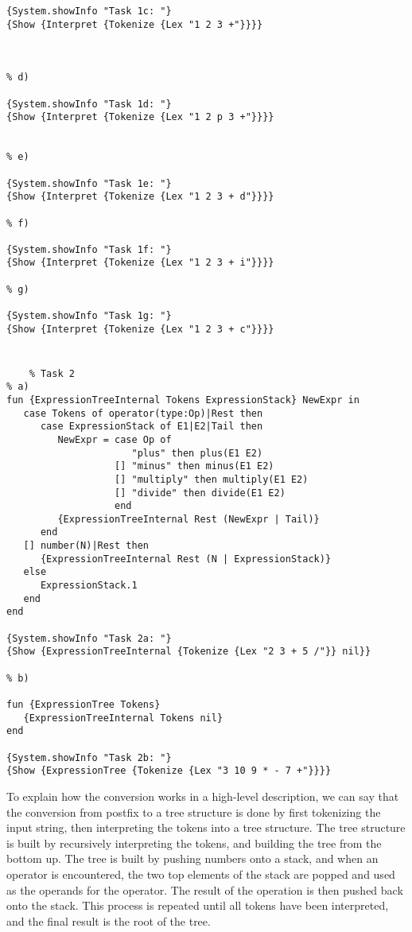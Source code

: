 \documentclass[11pt,a4paper]{report}
\begin{document}
\begin{lstlisting}[language=Oz]
{System.showInfo "Task 1c: "}
{Show {Interpret {Tokenize {Lex "1 2 3 +"}}}}



% d)

{System.showInfo "Task 1d: "}
{Show {Interpret {Tokenize {Lex "1 2 p 3 +"}}}}


% e)

{System.showInfo "Task 1e: "}
{Show {Interpret {Tokenize {Lex "1 2 3 + d"}}}}

% f)

{System.showInfo "Task 1f: "}
{Show {Interpret {Tokenize {Lex "1 2 3 + i"}}}}

% g)

{System.showInfo "Task 1g: "}
{Show {Interpret {Tokenize {Lex "1 2 3 + c"}}}}
\end{lstlisting}







\section{}
\begin{lstlisting}
    % Task 2
% a)
fun {ExpressionTreeInternal Tokens ExpressionStack} NewExpr in
   case Tokens of operator(type:Op)|Rest then
      case ExpressionStack of E1|E2|Tail then
         NewExpr = case Op of
                      "plus" then plus(E1 E2)
                   [] "minus" then minus(E1 E2)
                   [] "multiply" then multiply(E1 E2)
                   [] "divide" then divide(E1 E2)
                   end
         {ExpressionTreeInternal Rest (NewExpr | Tail)}
      end
   [] number(N)|Rest then
      {ExpressionTreeInternal Rest (N | ExpressionStack)}
   else
      ExpressionStack.1
   end
end

{System.showInfo "Task 2a: "}
{Show {ExpressionTreeInternal {Tokenize {Lex "2 3 + 5 /"}} nil}}

% b)

fun {ExpressionTree Tokens}
   {ExpressionTreeInternal Tokens nil}
end

{System.showInfo "Task 2b: "}
{Show {ExpressionTree {Tokenize {Lex "3 10 9 * - 7 +"}}}}
\end{lstlisting}

To explain how the conversion works in a high-level description, we can say that the conversion from postfix to a tree structure is done by first tokenizing the input string, then interpreting the tokens into a tree structure. The tree structure is built by recursively interpreting the tokens, and building the tree from the bottom up. The tree is built by pushing numbers onto a stack, and when an operator is encountered, the two top elements of the stack are popped and used as the operands for the operator. The result of the operation is then pushed back onto the stack. This process is repeated until all tokens have been interpreted, and the final result is the root of the tree.
\end{document}
